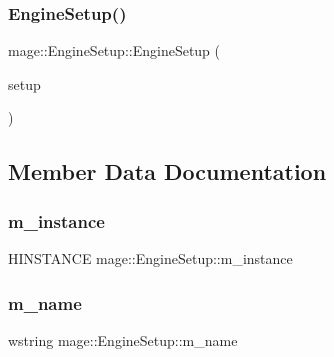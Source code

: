 \hypertarget{structmage_1_1_engine_setup_a2399c7966ed02ce9e9ab951b7483aac1}{}\label{structmage_1_1_engine_setup_a2399c7966ed02ce9e9ab951b7483aac1} 
\subsubsection{\texorpdfstring{Engine\+Setup()}{EngineSetup()}\hspace{0.1cm}{\footnotesize\ttfamily [2/2]}}
{\footnotesize\ttfamily mage\+::\+Engine\+Setup\+::\+Engine\+Setup (\begin{DoxyParamCaption}\item[{const \hyperlink{structmage_1_1_engine_setup}{Engine\+Setup} \&}]{setup }\end{DoxyParamCaption})}



\subsection{Member Data Documentation}
\hypertarget{structmage_1_1_engine_setup_a13e9577c9762cccf127b51c1188d9477}{}\label{structmage_1_1_engine_setup_a13e9577c9762cccf127b51c1188d9477} 
\subsubsection{\texorpdfstring{m\+\_\+instance}{m\_instance}}
{\footnotesize\ttfamily H\+I\+N\+S\+T\+A\+N\+CE mage\+::\+Engine\+Setup\+::m\+\_\+instance}

\hypertarget{structmage_1_1_engine_setup_a3866920e44c0752a89265f9f0c5c5d05}{}\label{structmage_1_1_engine_setup_a3866920e44c0752a89265f9f0c5c5d05} 
\subsubsection{\texorpdfstring{m\+\_\+name}{m\_name}}
{\footnotesize\ttfamily wstring mage\+::\+Engine\+Setup\+::m\+\_\+name}

